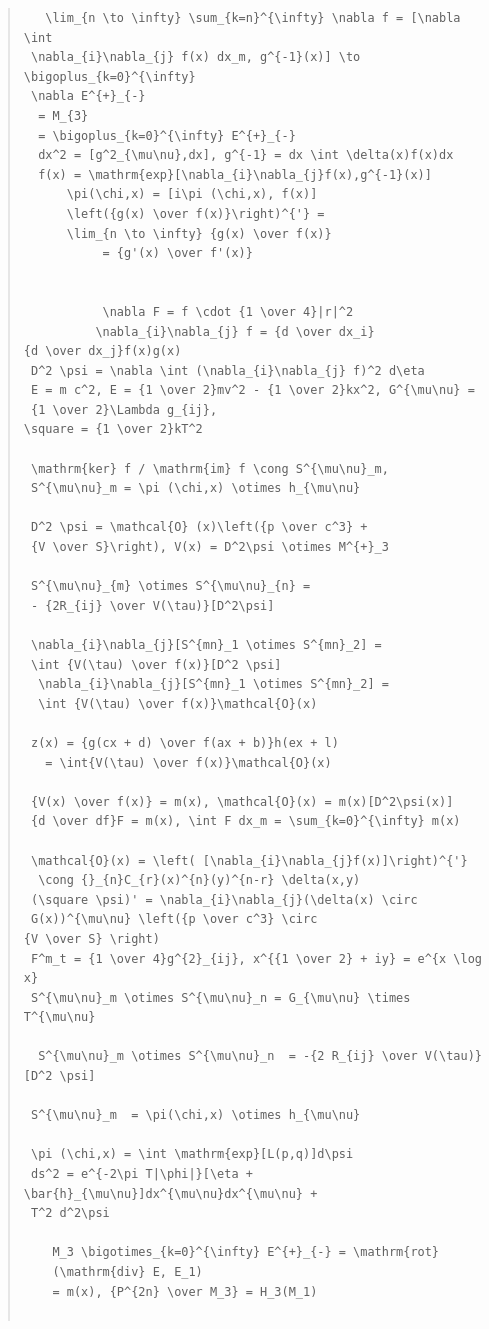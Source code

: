 \documentclass{jsarticle}
\begin{document}
{\begin{quote}
\begin{verbatim}
   \lim_{n \to \infty} \sum_{k=n}^{\infty} \nabla f = [\nabla \int 
 \nabla_{i}\nabla_{j} f(x) dx_m, g^{-1}(x)] \to \bigoplus_{k=0}^{\infty}  
 \nabla E^{+}_{-} 
  = M_{3} 
  = \bigoplus_{k=0}^{\infty} E^{+}_{-} 
  dx^2 = [g^2_{\mu\nu},dx], g^{-1} = dx \int \delta(x)f(x)dx 
  f(x) = \mathrm{exp}[\nabla_{i}\nabla_{j}f(x),g^{-1}(x)] 
	  \pi(\chi,x) = [i\pi (\chi,x), f(x)] 
	  \left({g(x) \over f(x)}\right)^{'} =
	  \lim_{n \to \infty} {g(x) \over f(x)} 
           = {g'(x) \over f'(x)} 


		   \nabla F = f \cdot {1 \over 4}|r|^2
		  \nabla_{i}\nabla_{j} f = {d \over dx_i}
{d \over dx_j}f(x)g(x) 
 D^2 \psi = \nabla \int (\nabla_{i}\nabla_{j} f)^2 d\eta 
 E = m c^2, E = {1 \over 2}mv^2 - {1 \over 2}kx^2, G^{\mu\nu} = 
 {1 \over 2}\Lambda g_{ij}, 
\square = {1 \over 2}kT^2 

 \mathrm{ker} f / \mathrm{im} f \cong S^{\mu\nu}_m, 
 S^{\mu\nu}_m = \pi (\chi,x) \otimes h_{\mu\nu} 

 D^2 \psi = \mathcal{O} (x)\left({p \over c^3} + 
 {V \over S}\right), V(x) = D^2\psi \otimes M^{+}_3 

 S^{\mu\nu}_{m} \otimes S^{\mu\nu}_{n} = 
 - {2R_{ij} \over V(\tau)}[D^2\psi] 

 \nabla_{i}\nabla_{j}[S^{mn}_1 \otimes S^{mn}_2] = 
 \int {V(\tau) \over f(x)}[D^2 \psi] 
  \nabla_{i}\nabla_{j}[S^{mn}_1 \otimes S^{mn}_2] = 
  \int {V(\tau) \over f(x)}\mathcal{O}(x) 

 z(x) = {g(cx + d) \over f(ax + b)}h(ex + l) 
   = \int{V(\tau) \over f(x)}\mathcal{O}(x) 

 {V(x) \over f(x)} = m(x), \mathcal{O}(x) = m(x)[D^2\psi(x)] 
 {d \over df}F = m(x), \int F dx_m = \sum_{k=0}^{\infty} m(x) 

 \mathcal{O}(x) = \left( [\nabla_{i}\nabla_{j}f(x)]\right)^{'} 
  \cong {}_{n}C_{r}(x)^{n}(y)^{n-r} \delta(x,y) 
 (\square \psi)' = \nabla_{i}\nabla_{j}(\delta(x) \circ 
 G(x))^{\mu\nu} \left({p \over c^3} \circ 
{V \over S} \right) 
 F^m_t = {1 \over 4}g^{2}_{ij}, x^{{1 \over 2} + iy} = e^{x \log x} 
 S^{\mu\nu}_m \otimes S^{\mu\nu}_n = G_{\mu\nu} \times T^{\mu\nu} 

  S^{\mu\nu}_m \otimes S^{\mu\nu}_n  = -{2 R_{ij} \over V(\tau)}[D^2 \psi] 

 S^{\mu\nu}_m  = \pi(\chi,x) \otimes h_{\mu\nu} 

 \pi (\chi,x) = \int \mathrm{exp}[L(p,q)]d\psi 
 ds^2 = e^{-2\pi T|\phi|}[\eta + \bar{h}_{\mu\nu}]dx^{\mu\nu}dx^{\mu\nu} + 
 T^2 d^2\psi 

    M_3 \bigotimes_{k=0}^{\infty} E^{+}_{-} = \mathrm{rot}
    (\mathrm{div} E, E_1)
    = m(x), {P^{2n} \over M_3} = H_3(M_1) 


\end{verbatim}
\end{quote}}
\end{document}
